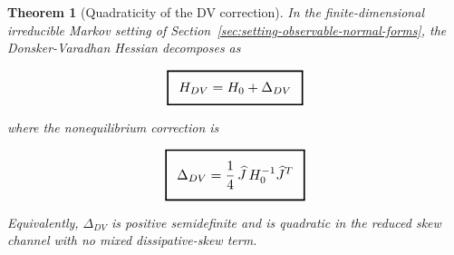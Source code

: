 \documentclass[11pt,a4paper]{article}
\numberwithin{equation}{section}
\theoremstyle{thmcompact}
\newtheorem{theorem}{Theorem}[section]
\theoremstyle{remark}
\begin{document}
\begin{theorem}[Quadraticity of the DV correction]
\label{thm:exact_quadraticity}
In the finite-dimensional irreducible Markov setting of Section~\ref{sec:setting-observable-normal-forms}, the Donsker-Varadhan Hessian decomposes as

\[
\begingroup
\setlength{\fboxsep}{8pt}%
\setlength{\fboxrule}{1.15pt}%
\boxed{\scalebox{1.08}{$\displaystyle H_{DV}=H_0+\Delta_{DV}$}}%
\endgroup
\]

\begin{center}
where the nonequilibrium correction is
\end{center}
\[
\begingroup
\setlength{\fboxsep}{8pt}%
\setlength{\fboxrule}{1.15pt}%
\boxed{\scalebox{1.08}{$\displaystyle \Delta_{DV}=\frac14\,\widehat J\,H_0^{-1}\widehat J^{T}$}}%
\endgroup
\]

Equivalently, \(\Delta_{DV}\) is positive semidefinite and is quadratic in the reduced skew channel with no mixed dissipative-skew term.
\end{theorem}
\end{document}
